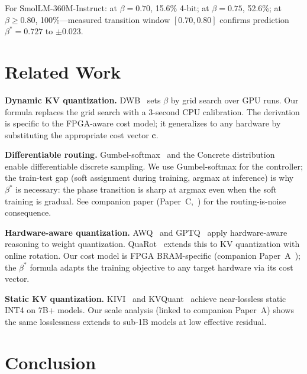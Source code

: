 \documentclass{article}
\begin{document}
For SmolLM-360M-Instruct: at $\beta{=}0.70$, 15.6\% 4-bit; at $\beta{=}0.75$, 52.6\%;
at $\beta{\geq}0.80$, 100\%---measured transition window $[0.70, 0.80]$ confirms prediction
$\beta^*{=}0.727$ to $\pm 0.023$.

\section{Related Work}
\label{sec:related}

\textbf{Dynamic KV quantization.} DWB~\citep{haeri2026dwb} sets $\beta$ by grid search over
GPU runs. Our formula replaces the grid search with a 3-second CPU calibration. The derivation
is specific to the FPGA-aware cost model; it generalizes to any hardware by substituting
the appropriate cost vector $\mathbf{c}$.

\textbf{Differentiable routing.} Gumbel-softmax~\citep{jang2017gumbel} and the Concrete
distribution~\citep{maddison2017concrete} enable differentiable discrete sampling. We use
Gumbel-softmax for the controller; the train-test gap (soft assignment during training,
argmax at inference) is why $\beta^*$ is necessary: the phase transition is sharp at argmax
even when the soft training is gradual. See companion paper (Paper~C,~\citep{companion_paper_c})
for the routing-is-noise consequence.

\textbf{Hardware-aware quantization.} AWQ~\citep{lin2023awq} and GPTQ~\citep{frantar2022gptq}
apply hardware-aware reasoning to weight quantization. QuaRot~\citep{ashkboos2024quarot}
extends this to KV quantization with online rotation. Our cost model is FPGA BRAM-specific
(companion Paper~A~\citep{companion_paper_a}); the $\beta^*$ formula adapts the training
objective to any target hardware via its cost vector.

\textbf{Static KV quantization.} KIVI~\citep{liu2024kivi} and KVQuant~\citep{hooper2024kvquant}
achieve near-lossless static INT4 on 7B+ models. Our scale analysis (linked to companion
Paper~A) shows the same losslessness extends to sub-1B models at low effective residual.

\section{Conclusion}
\label{sec:conclusion}
\end{document}
